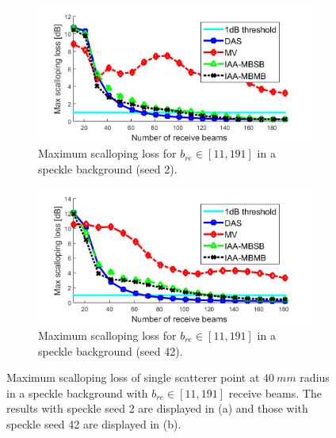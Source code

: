 \begin{figure}[ht]
    \centering
    \begin{subfigure}[t]{\linewidth}
        \includegraphics[width=\linewidth]{./images/results/1/loss_vs_beams_speckle2.png}
        \caption{Maximum scalloping loss for $b_{re} \in [11, 191]$ in a speckle background (seed 2).}
    \end{subfigure}
    \quad
    \begin{subfigure}[t]{\linewidth}
        \includegraphics[width=\linewidth]{./images/results/1/loss_vs_beams_speckle42.png}
        \caption{Maximum scalloping loss for $b_{re} \in [11, 191]$ in a speckle background (seed 42).}
    \end{subfigure}
	\caption[Maximum scalloping loss of single scatterer point at $40~mm$ radius in a speckle background with varying number of receive beams $b_{re}$.]{Maximum scalloping loss of single scatterer point at $40~mm$ radius in a speckle background with $b_{re} \in [11, 191]$ receive beams. The results with speckle seed 2 are displayed in (a) and those with speckle seed 42 are displayed in (b).}
	\label{fig:loss_vs_beams_speckle}
\end{figure}

